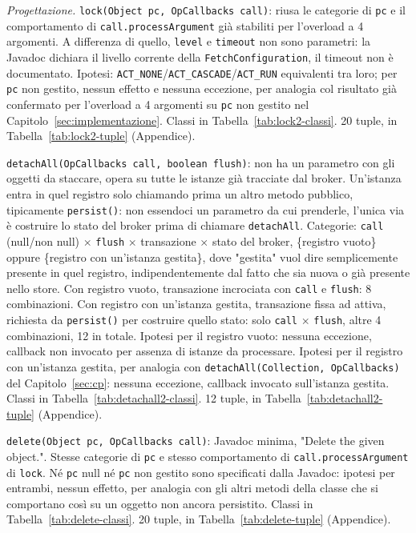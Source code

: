 \textit{Progettazione.} \texttt{lock(Object pc, OpCallbacks call)}: riusa le categorie di
\texttt{pc} e il comportamento di \texttt{call.processArgument} già stabiliti per l'overload a 4
argomenti. A differenza di quello, \texttt{level} e \texttt{timeout} non sono parametri: la
Javadoc dichiara il livello corrente della \texttt{FetchConfiguration}, il timeout non è
documentato. Ipotesi: \texttt{ACT\_NONE}/\texttt{ACT\_CASCADE}/\texttt{ACT\_RUN} equivalenti tra
loro; per \texttt{pc} non gestito, nessun effetto e nessuna eccezione, per analogia col risultato
già confermato per l'overload a 4 argomenti su \texttt{pc} non gestito nel
Capitolo~\ref{sec:implementazione}. Classi in Tabella~\ref{tab:lock2-classi}. 20 tuple, in Tabella~\ref{tab:lock2-tuple} (Appendice).

\texttt{detachAll(OpCallbacks call, boolean flush)}: non ha un parametro con gli oggetti da
staccare, opera su tutte le istanze già tracciate dal broker. Un'istanza entra in quel registro
solo chiamando prima un altro metodo pubblico, tipicamente \texttt{persist()}: non essendoci un
parametro da cui prenderle, l'unica via è costruire lo stato del broker prima di chiamare
\texttt{detachAll}. Categorie: \texttt{call} (null/non null) $\times$ \texttt{flush} $\times$
transazione $\times$ stato del broker, \{registro vuoto\} oppure \{registro con un'istanza
gestita\}, dove "gestita" vuol dire semplicemente presente in quel registro, indipendentemente dal
fatto che sia nuova o già presente nello store. Con registro vuoto, transazione incrociata con
\texttt{call} e \texttt{flush}: 8 combinazioni. Con registro con un'istanza gestita, transazione
fissa ad attiva, richiesta da \texttt{persist()} per costruire quello stato: solo \texttt{call}
$\times$ \texttt{flush}, altre 4 combinazioni, 12 in totale. Ipotesi per il registro vuoto:
nessuna eccezione, callback non invocato per assenza di istanze da processare. Ipotesi per il
registro con un'istanza gestita, per analogia con \texttt{detachAll(Collection, OpCallbacks)} del
Capitolo~\ref{sec:cp}: nessuna eccezione, callback invocato sull'istanza gestita. Classi in
Tabella~\ref{tab:detachall2-classi}. 12 tuple, in Tabella~\ref{tab:detachall2-tuple} (Appendice).

\texttt{delete(Object pc, OpCallbacks call)}: Javadoc minima, "Delete the given object.". Stesse
categorie di \texttt{pc} e stesso comportamento di \texttt{call.processArgument} di \texttt{lock}.
Né \texttt{pc} null né \texttt{pc} non gestito sono specificati dalla Javadoc: ipotesi per
entrambi, nessun effetto, per analogia con gli altri metodi della classe che si comportano così su
un oggetto non ancora persistito. Classi in Tabella~\ref{tab:delete-classi}. 20 tuple, in Tabella~\ref{tab:delete-tuple} (Appendice).

